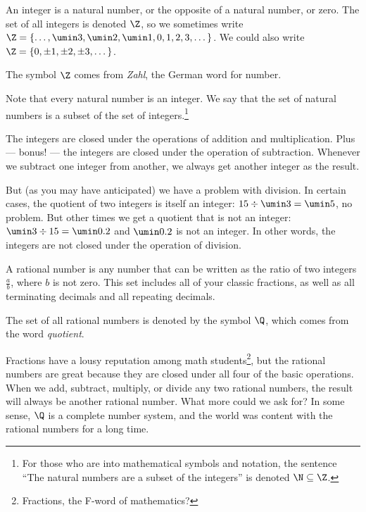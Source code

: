 \begin{boxeddef}[Integer]
An \gls{integer} is a natural number, or the opposite of a natural number, or zero. The set of all integers is denoted $\Z$, so we sometimes write $\Z = \{\dotsc, \umin3, \umin2, \umin1, 0, 1, 2, 3, \dotsc \}$. We could also write $\Z = \{0, \pm1, \pm2, \pm3, \dotsc\}$.

The symbol $\Z$ comes from \textit{Zahl}, the German word for number.
\end{boxeddef}

Note that every natural number is an integer. We say that the set of natural numbers is a \gls{subset} of the set of integers.\footnote{For those who are into mathematical symbols and notation, the sentence ``The natural numbers are a subset of the integers'' is denoted $\N \subseteq \Z$.}

The integers are closed under the operations of addition and multiplication. Plus --- bonus! --- the integers are closed under the operation of subtraction. Whenever we subtract one integer from another, we always get another integer as the result.

But (as you may have anticipated) we have a problem with division. In certain cases, the quotient of two integers is itself an integer: $15 \div \umin3 = \umin5$, no problem. But other times we get a quotient that is not an integer: $\umin3 \div 15 = \umin0.2$ and $\umin0.2$ is not an integer. In other words, the integers are not closed under the operation of division.

\begin{boxeddef}
\label{def:rationals}
A \gls{rational number} is any number that can be written as the ratio of two integers $\frac{a}{b}$, where $b$ is not zero. This set includes all of your classic fractions, as well as all terminating decimals and all repeating decimals.


The set of all rational numbers is denoted by the symbol $\Q$, which comes from the word \textit{quotient}.
\end{boxeddef}

Fractions have a lousy reputation among math students\footnote{Fractions, the F-word of mathematics?}, but the rational numbers are great because they are closed under all four of the basic operations. When we add, subtract, multiply, or divide any two rational numbers, the result will always be another rational number. What more could we ask for? In some sense, $\Q$ is a complete number system, and the world was content with the rational numbers for a long time.

